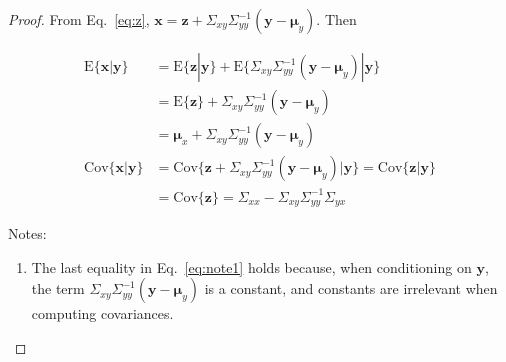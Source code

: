 \begin{proof}
    From Eq.~\ref{eq:z},
    $\mathbf{x}=\mathbf{z}+\Sigma_{xy}\Sigma_{yy}^{-1}(\mathbf{y}-\boldsymbol{\mu}_y)$.
    Then

    \begin{align}
        \text{E}\{\mathbf{x}|\mathbf{y}\}&=\text{E}\{\mathbf{z}|\mathbf{y}\}+\text{E}\{\Sigma_{xy}\Sigma_{yy}^{-1}(\mathbf{y}-\boldsymbol{\mu}_y)|\mathbf{y}\}\nonumber\\
                                         &=\text{E}\{\mathbf{z}\}+\Sigma_{xy}\Sigma_{yy}^{-1}(\mathbf{y}-\boldsymbol{\mu}_y)\nonumber\\
                                         &=\boldsymbol{\mu}_x+\Sigma_{xy}\Sigma_{yy}^{-1}(\mathbf{y}-\boldsymbol{\mu}_y)\nonumber\\
        \text{Cov}\{\mathbf{x}|\mathbf{y}\}&=\text{Cov}\{\mathbf{z}+\Sigma_{xy}\Sigma_{yy}^{-1}(\mathbf{y}-\boldsymbol{\mu}_y)|\mathbf{y}\}=\text{Cov}\{\mathbf{z}|\mathbf{y}\}\label{eq:note1}\\
                                           &=\text{Cov}\{\mathbf{z}\}=\Sigma_{xx}-\Sigma_{xy}\Sigma_{yy}^{-1}\Sigma_{yx}\nonumber
    \end{align}

    Notes:

    \begin{enumerate}

        \item The last equality in Eq.~\ref{eq:note1} holds because, when
            conditioning on $\mathbf{y}$, the term
            $\Sigma_{xy}\Sigma_{yy}^{-1}(\mathbf{y}-\boldsymbol{\mu}_y)$ is a
            constant, and constants are irrelevant when computing covariances.

    \end{enumerate}

\end{proof}
